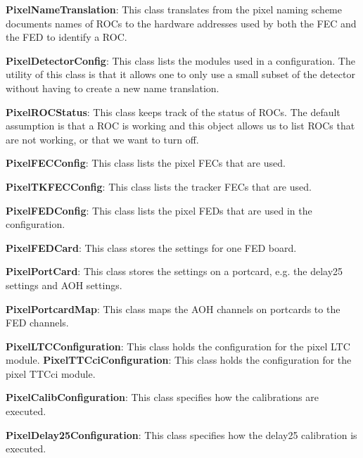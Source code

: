 \vskip 0.5cm
\noindent
{\bf PixelNameTranslation}: This class translates from the pixel 
                            naming scheme documents names of ROCs to
                            the hardware addresses used by both the
                            FEC and the FED to identify a ROC.

\vskip 0.5cm
\noindent
{\bf PixelDetectorConfig}: This class lists the modules used in a 
                           configuration. The utility of this class
                           is that it allows one to only use a small
                           subset of the detector without having to 
                           create a new name translation.

\vskip 0.5cm
\noindent
{\bf PixelROCStatus}: This class keeps track of the status of 
                      ROCs. The default assumption is that a ROC
                      is working and this object allows us to 
                      list ROCs that are not working, or that we 
                      want to turn off.

\vskip 0.5cm
\noindent
{\bf PixelFECConfig}: This class lists the pixel FECs that are used.

\vskip 0.5cm
\noindent
{\bf PixelTKFECConfig}: This class lists the tracker FECs that are used.

\vskip 0.5cm
\noindent
{\bf PixelFEDConfig}: This class lists the pixel FEDs that are used in
                      the configuration.

\vskip 0.5cm
\noindent
{\bf PixelFEDCard}: This class stores the settings for one FED board.

\vskip 0.5cm
\noindent
{\bf PixelPortCard}: This class stores the settings on a portcard, e.g.
                     the delay25 settings and AOH settings.

\vskip 0.5cm
\noindent
{\bf PixelPortcardMap}: This class maps the AOH channels on portcards
                        to the FED channels.


\vskip 0.5cm
\noindent
{\bf PixelLTCConfiguration}: This class holds the configuration for the 
                             pixel LTC module.
\vskip 0.5cm
\noindent
{\bf PixelTTCciConfiguration}: This class holds the configuration for the 
                               pixel TTCci module.

\vskip 0.5cm
\noindent
{\bf PixelCalibConfiguration}: This class specifies how the calibrations
                               are executed. 

\vskip 0.5cm
\noindent
{\bf PixelDelay25Configuration}: This class specifies how the delay25 
                                 calibration is executed.

